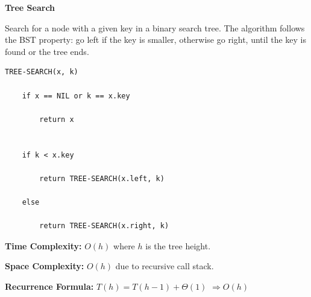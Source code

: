 \documentclass[a4paper,12pt]{article}
\begin{document}
\begin{tcolorbox}[
    colback=gray!30,
    colframe=black,
    boxrule=1pt,
    arc=0mm
]

\begin{tcolorbox}[
    colback=gray!10,
    colframe=black,
    arc=0mm
]
\centering
{\Huge\bfseries Tree Search}
\end{tcolorbox}


\begin{tcolorbox}[
    colback=gray!10,
    colframe=black,
    arc=0mm
]
\small
Search for a node with a given key in a binary search tree.
The algorithm follows the BST property: go left if the key is smaller,
otherwise go right, until the key is found or the tree ends.
\end{tcolorbox}


\begin{tcolorbox}[
    colback=black!5,
    colframe=black,
    arc=0mm,
    title=Pseudo-code
]
\tiny
\begin{lstlisting}
TREE-SEARCH(x, k)

    if x == NIL or k == x.key

        return x


    if k < x.key

        return TREE-SEARCH(x.left, k)

    else

        return TREE-SEARCH(x.right, k)
\end{lstlisting}
\end{tcolorbox}


\begin{tcolorbox}[
    colback=cyan!20,
    colframe=black,
    arc=0mm
]
\small
\textbf{Time Complexity:}
$O(h)$ where $h$ is the tree height.
\end{tcolorbox}


\begin{tcolorbox}[
    colback=violet!20,
    colframe=black,
    arc=0mm
]
\small
\textbf{Space Complexity:}
$O(h)$ due to recursive call stack.
\end{tcolorbox}


\begin{tcolorbox}[
    colback=pink!20,
    colframe=black,
    arc=0mm
]
\small
\textbf{Recurrence Formula:}
$T(h)=T(h-1)+\Theta(1)$
$\Rightarrow O(h)$
\end{tcolorbox}

\end{tcolorbox}
\end{document}
